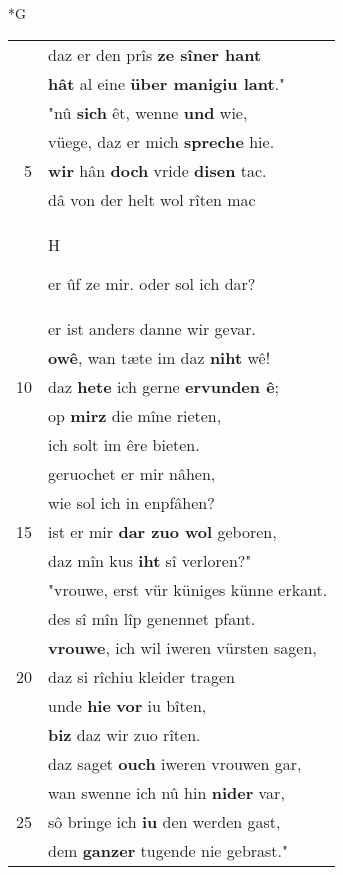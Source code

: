 \documentclass[8pt,a4paper,notitlepage]{article}
\begin{document}
\begin{table}[ht]
\begin{minipage}[t]{0.5\linewidth}
\small
\begin{center}*G
\end{center}
\begin{tabular}{rl}
 & daz er den prîs \textbf{ze sîner hant}\\ 
 & \textbf{hât} al eine \textbf{über manigiu lant}."\\ 
 & "nû \textbf{sich} êt, wenne \textbf{und} wie,\\ 
 & vüege, daz er mich \textbf{spreche} hie.\\ 
5 & \textbf{wir} hân \textbf{doch} vride \textbf{disen} tac.\\ 
 & dâ von der helt wol rîten mac\\ 
 & \begin{large}H\end{large}er ûf ze mir. oder sol ich dar?\\ 
 & er ist anders danne wir gevar.\\ 
 & \textbf{owê}, wan tæte im daz \textbf{niht} wê!\\ 
10 & daz \textbf{hete} ich gerne \textbf{ervunden ê};\\ 
 & op \textbf{mirz} die mîne rieten,\\ 
 & ich solt im êre bieten.\\ 
 & geruochet er mir nâhen,\\ 
 & wie sol ich in enpfâhen?\\ 
15 & ist er mir \textbf{dar zuo wol} geboren,\\ 
 & daz mîn kus \textbf{iht} sî verloren?"\\ 
 & "vrouwe, erst vür küniges künne erkant.\\ 
 & des sî mîn lîp genennet pfant.\\ 
 & \textbf{vrouwe}, ich wil iweren vürsten sagen,\\ 
20 & daz si rîchiu kleider tragen\\ 
 & unde \textbf{hie} \textbf{vor} iu bîten,\\ 
 & \textbf{biz} daz wir zuo rîten.\\ 
 & daz saget \textbf{ouch} iweren vrouwen gar,\\ 
 & wan swenne ich nû hin \textbf{nider} var,\\ 
25 & sô bringe ich \textbf{iu} den werden gast,\\ 
 & dem \textbf{ganzer} tugende nie gebrast."\\ 

\end{tabular}
\end{minipage}
\end{table}
\end{document}
